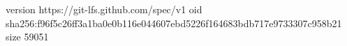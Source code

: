 version https://git-lfs.github.com/spec/v1
oid sha256:f96f5c26ff3a1ba0e0b116e044607ebd5226f164683bdb717e9733307c958b21
size 59051
